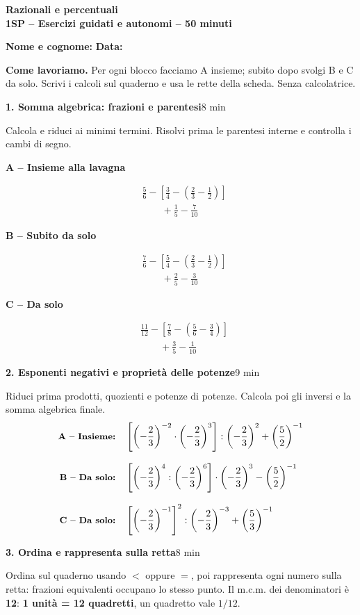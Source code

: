 \documentclass[11pt,a4paper]{article}
\newcommand{\blocco}[3]{\par\medskip\noindent\textbf{#1. #2}\hfill{\small #3 min}\par\nopagebreak}
\newcommand{\terna}[3]{%
\par\smallskip\noindent
\begin{minipage}[t]{.323\textwidth}\raggedright
\textbf{\small A -- Insieme alla lavagna}\par\smallskip #1
\end{minipage}\hfill
\begin{minipage}[t]{.323\textwidth}\raggedright
\textbf{\small B -- Subito da solo}\par\smallskip #2
\end{minipage}\hfill
\begin{minipage}[t]{.323\textwidth}\raggedright
\textbf{\small C -- Da solo}\par\smallskip #3
\end{minipage}\par}
\begin{document}
\begin{center}
{\Large\textbf{Razionali e percentuali}}\\[2pt]
\textbf{1SP -- Esercizi guidati e autonomi -- 50 minuti}
\end{center}
\textbf{Nome e cognome:} \dotfill \quad \textbf{Data:} \dotfill

\textbf{Come lavoriamo.} Per ogni blocco facciamo A insieme; subito dopo svolgi B e C da solo. Scrivi i calcoli sul quaderno e usa le rette della scheda. Senza calcolatrice.

\blocco{1}{Somma algebrica: frazioni e parentesi}{8}
Calcola e riduci ai minimi termini. Risolvi prima le parentesi interne e controlla i cambi di segno.
\terna{
\[
\begin{aligned}
&\frac56-\left[\frac34-\left(\frac23-\frac12\right)\right]\\[4pt]
&\qquad+\frac15-\frac7{10}
\end{aligned}
\]
}{
\[
\begin{aligned}
&\frac76-\left[\frac54-\left(\frac23-\frac12\right)\right]\\[4pt]
&\qquad+\frac25-\frac3{10}
\end{aligned}
\]
}{
\[
\begin{aligned}
&\frac{11}{12}-\left[\frac78-\left(\frac56-\frac34\right)\right]\\[4pt]
&\qquad+\frac35-\frac1{10}
\end{aligned}
\]
}

\blocco{2}{Esponenti negativi e proprietà delle potenze}{9}
Riduci prima prodotti, quozienti e potenze di potenze. Calcola poi gli inversi e la somma algebrica finale.
\[
\begin{aligned}
\text{\small\bfseries A -- Insieme:}\quad&
\left[\left(-\frac23\right)^{-2}\cdot\left(-\frac23\right)^3\right]
:\left(-\frac23\right)^2+\left(\frac52\right)^{-1}\\[8pt]
\text{\small\bfseries B -- Da solo:}\quad&
\left[\left(-\frac23\right)^4:\left(-\frac23\right)^6\right]
\cdot\left(-\frac23\right)^3-\left(\frac52\right)^{-1}\\[8pt]
\text{\small\bfseries C -- Da solo:}\quad&
\left[\left(-\frac23\right)^{-1}\right]^2
:\left(-\frac23\right)^{-3}+\left(\frac53\right)^{-1}
\end{aligned}
\]

\blocco{3}{Ordina e rappresenta sulla retta}{8}
Ordina sul quaderno usando $<$ oppure $=$, poi rappresenta ogni numero sulla retta: frazioni equivalenti occupano lo stesso punto. Il m.c.m. dei denominatori è \textbf{12}: \textbf{1 unità = 12 quadretti}, un quadretto vale $1/12$.
\end{document}
